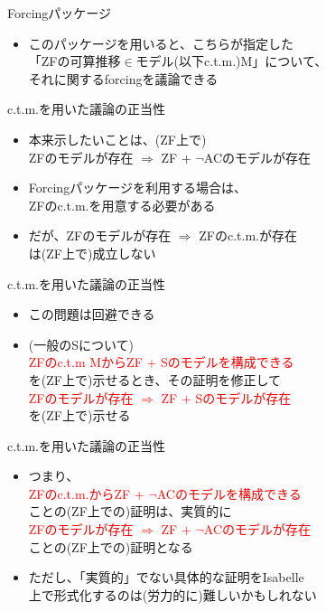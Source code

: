 \documentclass[17pt,aspectratio=169]{beamer}
\begin{document}
\begin{frame} {Forcingパッケージ}
    \begin{itemize}
        \item このパッケージを用いると、こちらが指定した\\
              「ZFの可算推移$\in$モデル{\small(以下c.t.m.)}M」について、\\
              それに関するforcingを議論できる
    \end{itemize}
\end{frame}

\begin{frame} {c.t.m.を用いた議論の正当性}
    \begin{itemize}
        \item 本来示したいことは、{\small (ZF上で)}\\
              ZFのモデルが存在 $\Rightarrow$ ZF + $\neg$ACのモデルが存在
        \item Forcingパッケージを利用する場合は、\\
              ZFのc.t.m.を用意する必要がある
        \item だが、ZFのモデルが存在 $\Rightarrow$ ZFのc.t.m.が存在\\
              は{\small (ZF上で)}成立しない
    \end{itemize}
\end{frame}

\begin{frame} {c.t.m.を用いた議論の正当性}
    \begin{itemize}
        \item この問題は回避できる
        \item {\small (一般のSについて) } \\
              \textcolor{red}{ZFのc.t.m MからZF + Sのモデルを構成できる}\\
              を{\small (ZF上で)}示せるとき、その証明を修正して\\
              \textcolor{red}{ZFのモデルが存在 $\Rightarrow$ ZF + Sのモデルが存在}\\
              を{\small (ZF上で)}示せる
    \end{itemize}
\end{frame}

\begin{frame} {c.t.m.を用いた議論の正当性}
    \begin{itemize}
        \item つまり、\\
              \textcolor{red}{ZFのc.t.m.からZF + $\neg$ACのモデルを構成できる}\\
              ことの{\small (ZF上での)}証明は、実質的に\\
              \textcolor{red}{ZFのモデルが存在 $\Rightarrow$ ZF + $\neg$ACのモデルが存在}\\
              ことの{\small (ZF上での)}証明となる
        \item ただし、「実質的」でない具体的な証明をIsabelle\\
              上で形式化するのは{\small (労力的に)}難しいかもしれない
    \end{itemize}
\end{frame}
\end{document}
